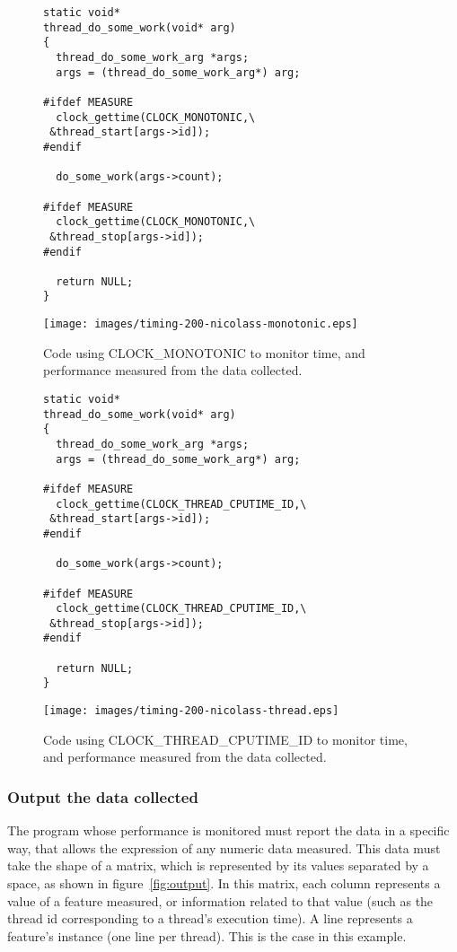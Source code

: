 \begin{figure}
\centering
\begin{lstlisting}
static void*
thread_do_some_work(void* arg)
{
  thread_do_some_work_arg *args;
  args = (thread_do_some_work_arg*) arg;

#ifdef MEASURE
  clock_gettime(CLOCK_MONOTONIC,\
 &thread_start[args->id]);
#endif

  do_some_work(args->count);

#ifdef MEASURE
  clock_gettime(CLOCK_MONOTONIC,\
 &thread_stop[args->id]);
#endif

  return NULL;
}
\end{lstlisting}
\texttt{[image: images/timing-200-nicolass-monotonic.eps]}
\caption{Code using CLOCK\_MONOTONIC to monitor time, and performance measured from the data collected.}
\label{fig:monotonic}
\end{figure}

\begin{figure}
\centering
\begin{lstlisting}
static void*
thread_do_some_work(void* arg)
{
  thread_do_some_work_arg *args;
  args = (thread_do_some_work_arg*) arg;

#ifdef MEASURE
  clock_gettime(CLOCK_THREAD_CPUTIME_ID,\
 &thread_start[args->id]);
#endif

  do_some_work(args->count);

#ifdef MEASURE
  clock_gettime(CLOCK_THREAD_CPUTIME_ID,\
 &thread_stop[args->id]);
#endif

  return NULL;
}
\end{lstlisting}
\texttt{[image: images/timing-200-nicolass-thread.eps]}
\caption{Code using CLOCK\_THREAD\_CPUTIME\_ID to monitor time, and performance measured from the data collected.}
\label{fig:thread}
\end{figure}

\subsubsection{Output the data collected}

The program whose performance is monitored must report the data in a specific way, that allows the expression of any numeric data measured. This data must take the shape of a matrix, which is represented by its values separated by a space, as shown in figure~\ref{fig:output}. In this matrix, each column represents a value of a feature measured, or information related to that value (such as the thread id corresponding to a thread's execution time). A line represents a feature's instance (one line per thread). This is the case in this example.

